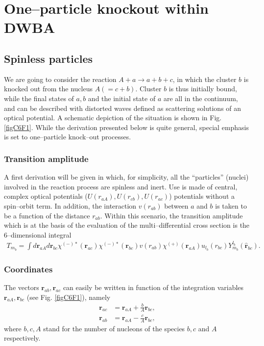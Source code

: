 \section{One--particle knockout within DWBA}\label{C6AppF}
\subsection{Spinless particles}
We are going to consider the reaction $A+a \rightarrow a+b+c$, in which the cluster $b$ is knocked out from the nucleus $A(=c+b)$. Cluster $b$ is thus initially bound, while the final states of $a,b$ and the initial state of $a$ are all in the continuum, and can be described with distorted waves defined as scattering solutions of an optical potential. A schematic depiction of the situation is shown in Fig. \ref{figC6F1}. While the derivation presented below is quite general, special emphasis is set to one--particle knock--out processes. 
\subsubsection{Transition amplitude}
A first derivation will be given in which, for simplicity, all the ``particles'' (nuclei) involved in the reaction process are spinless and inert. Use is made of central, complex optical potentials ($U(r_{aA}),U(r_{cb}),U(r_{ac})$) potentials without a spin--orbit term. In addition, the interaction $v(r_{ab})$ between $a$ and $b$ is taken to be a function of the distance $r_{ab}$. Within this scenario, the transition amplitude which is at the basis of the evaluation of the multi--differential cross section is the 6--dimensional integral
\begin{equation}\label{eqC6AppF1}
\begin{split}
T_{m_b}=\int d\mathbf{r}_{aA}d \mathbf{r}_{bc}\chi^{(-)*}(\mathbf{r}_{ac})\chi^{(-)*}(\mathbf{r}_{bc})v(r_{ab})\chi^{(+)}(\mathbf{r}_{aA})u_{l_b}(r_{bc})Y^{l_b}_{m_b}(\hat{\mathbf{r}}_{bc}).
\end{split}
\end{equation}
\subsubsection{Coordinates}
The vectors $\mathbf{r}_{ab},\mathbf{r}_{ac}$ can easily be written in function of the integration variables $\mathbf{r}_{aA},\mathbf{r}_{bc}$ (see Fig. \ref{figC6F1}), namely
\begin{equation}\label{eq6G2}
\begin{split}
\mathbf{r}_{ac}&=\mathbf{r}_{aA}+\frac{b}{A}\mathbf{r}_{bc},\\
\mathbf{r}_{ab}&=\mathbf{r}_{aA}-\frac{c}{A}\mathbf{r}_{bc},
\end{split}
\end{equation}
where $b,c,A$ stand for the number of nucleons of the species $b,c$ and $A$ respectively.
